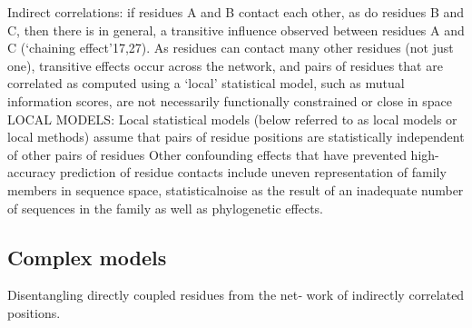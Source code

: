 Indirect correlations: \cite{marks2012protein}
	if residues A and B contact each other, as do residues B and C, then there is in general, a transitive influence observed between residues A and C (`chaining effect'17,27). \cite{marks2012protein}
	As residues can contact many other residues (not just one), transitive effects occur across the network, and pairs of residues that are correlated as computed using a `local' statistical model, such as mutual information scores, are not necessarily functionally constrained or close in space \cite{marks2012protein}
LOCAL MODELS: \cite{marks2012protein}
	Local statistical models (below referred to as local models or local methods) assume that pairs of residue positions are statistically independent of other pairs of residues  \cite{marks2012protein}
	Other confounding effects that have prevented high-accuracy prediction of residue contacts include uneven representation of family members in sequence space, statisticalnoise as the result of an inadequate number of sequences in the family as well as phylogenetic effects. \cite{marks2012protein}


\subsection{Complex models}
Disentangling directly coupled residues from the net‐ work of indirectly correlated positions.  \cite{de2013emerging}

